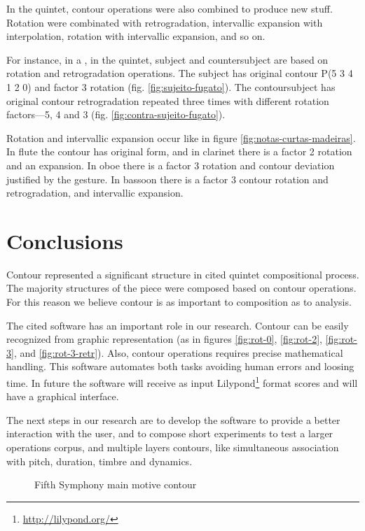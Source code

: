 In the quintet, contour operations were also combined to produce new
stuff. Rotation were combinated with retrogradation, intervallic
expansion with interpolation, rotation with intervallic expansion, and
so on.

For instance, in a , in the quintet, subject and
countersubject are based on rotation and retrogradation
operations. The subject has original contour P(5 3 4 1 2 0) and factor
3 rotation (fig. \ref{fig:sujeito-fugato}). The contoursubject has
original contour retrogradation repeated three times with different
rotation factors---5, 4 and 3 (fig. \ref{fig:contra-sujeito-fugato}).

Rotation and intervallic expansion occur like in figure
\ref{fig:notas-curtas-madeiras}. In flute the contour has original
form, and in clarinet there is a factor 2 rotation and an
expansion. In oboe there is a factor 3 rotation and contour deviation
justified by the gesture. In bassoon there is a factor 3 contour
rotation and retrogradation, and intervallic expansion.

\section{Conclusions}
\label{sec:conclusions}

Contour represented a significant structure in cited quintet
compositional process. The majority structures of the piece were
composed based on contour operations. For this reason we believe
contour is as important to composition as to analysis. 

The cited software has an important role in our research. Contour can
be easily recognized from graphic representation (as in figures
\ref{fig:rot-0}, \ref{fig:rot-2}, \ref{fig:rot-3}, and
\ref{fig:rot-3-retr}). Also, contour operations requires precise
mathematical handling. This software automates both tasks avoiding
human errors and loosing time. In future the software will receive as
input Lilypond\footnote{\url{http://lilypond.org/}} format scores and
will have a graphical interface.

The next steps in our research are to develop the software to provide
a better interaction with the user, and to compose short experiments
to test a larger operations corpus, and multiple layers contours, like
simultaneous association with pitch, duration, timbre and dynamics.

\break

\begin{figure}[!p]
  \centering
  \subfloat[Contour (3 1 2 0)]{
    \texttt{[image: c-3120]}
    \label{fig:c-3120}
  }
  \caption{Fifth Symphony main motive contour}
  \label{fig:5a-sinfonia}
\end{figure}

